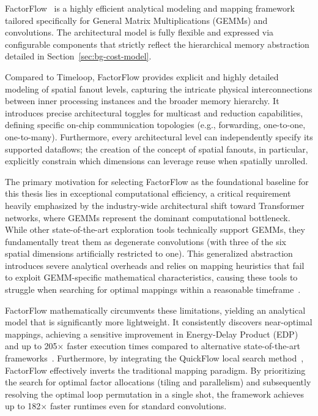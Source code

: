 FactorFlow~\cite{Factorflow} is a highly efficient analytical modeling and mapping framework tailored specifically for General Matrix Multiplications (GEMMs) and convolutions. The architectural model is fully flexible and expressed via configurable components that strictly reflect the hierarchical memory abstraction detailed in Section~\ref{sec:bg-cost-model}. 

Compared to Timeloop, FactorFlow provides explicit and highly detailed modeling of spatial fanout levels, capturing the intricate physical interconnections between inner processing instances and the broader memory hierarchy. It introduces precise architectural toggles for multicast and reduction capabilities, defining specific on-chip communication topologies (e.g., forwarding, one-to-one, one-to-many).  Furthermore, every architectural level can independently specify its supported dataflows; the creation of the concept of spatial fanouts, in particular, explicitly constrain which dimensions can leverage reuse when spatially unrolled. 

The primary motivation for selecting FactorFlow as the foundational baseline for this thesis lies in exceptional computational efficiency, a critical requirement heavily emphasized by the industry-wide architectural shift toward Transformer networks, where GEMMs represent the dominant computational bottleneck. While other state-of-the-art exploration tools technically support GEMMs, they fundamentally treat them as degenerate convolutions (with three of the six spatial dimensions artificially restricted to one). This generalized abstraction introduces severe analytical overheads and relies on mapping heuristics that fail to exploit GEMM-specific mathematical characteristics, causing these tools to struggle when searching for optimal mappings within a reasonable timeframe~\cite{Factorflow}. 

FactorFlow mathematically circumvents these limitations, yielding an analytical model that is significantly more lightweight. It consistently discovers near-optimal mappings, achieving a sensitive improvement in Energy-Delay Product (EDP) and up to 205$\times$ faster execution times compared to alternative state-of-the-art frameworks~\cite{Factorflow}. Furthermore, by integrating the QuickFlow local search method~\cite{Quickflow}, FactorFlow effectively inverts the traditional mapping paradigm. By prioritizing the search for optimal factor allocations (tiling and parallelism) and subsequently resolving the optimal loop permutation in a single shot, the framework achieves up to 182$\times$ faster runtimes even for standard convolutions. 


